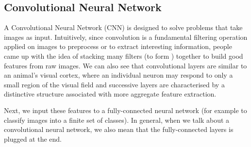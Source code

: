 \subsection{Convolutional Neural Network}
A Convolutional Neural Network (CNN) is designed to solve problems that take images as input. Intuitively, since convolution is a fundamental filtering operation applied on images to preprocess or to extract interesting information, people came up with the idea of stacking many filters (to form ) together to build good features from raw images. We can also see that convolutional layers are similar to an animal's visual cortex, where an individual neuron may respond to only a small region of the visual field and successive layers are characterised by a distinctive structure associated with more aggregate feature extraction.

Next, we input these features to a fully-connected neural network (for example to classify images into a finite set of classes). In general, when we talk about a convolutional neural network, we also mean that the fully-connected layers is plugged at the end. 

